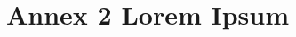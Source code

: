
%

\chapter{Annex 2 Lorem Ipsum}
\label{ann:lorem_ipsum2}

\lipsum[1-100]
\lipsum[1-100]
\lipsum[1-100]
\lipsum[1-100]
